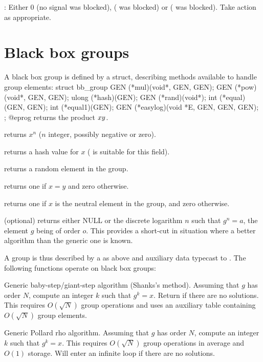 : Either $0$ (no signal was blocked), 
( was blocked) or  ( was blocked).
Take action as appropriate.

\section{Black box groups}

A black box group is defined by a  struct, describing methods
available to handle group elements:
\bprog
    struct bb_group
    {
      GEN (*mul)(void*, GEN, GEN);
      GEN (*pow)(void*, GEN, GEN);
      ulong (*hash)(GEN);
      GEN (*rand)(void*);
      int (*equal)(GEN, GEN);
      int (*equal1)(GEN);
      GEN (*easylog)(void *E, GEN, GEN, GEN);
    };
@eprog
 returns the product $x\*y$.

 returns $x^n$ ($n$ integer, possibly negative or zero).

 returns a hash value for $x$ ( is suitable for this field).

 returns a random element in the group.

 returns one if $x=y$ and zero otherwise.

 returns one if $x$ is the neutral element in the group,
and zero otherwise.

 (optional) returns either NULL or the discrete logarithm
$n$ such that $g^n=a$, the element $g$ being of order $o$. This provides a
short-cut in situation where a better algorithm than the generic one is known.

A group is thus described by a  as above and auxiliary
data typecast to . The following functions operate on black box
groups:

 \break
Generic baby-step/giant-step algorithm (Shanks's method). Assuming
that $g$ has order $N$, compute an integer $k$ such that $g^k = x$.
Return  if there are no solutions. This requires
$O(\sqrt{N})$ group operations and uses an auxiliary table containing
$O(\sqrt{N})$ group elements.

 \break
Generic Pollard rho algorithm. Assuming that $g$ has order $N$, compute an
integer $k$ such that $g^k = x$. This requires $O(\sqrt{N})$ group operations
in average and $O(1)$ storage. Will enter an infinite loop if there are no
solutions.

